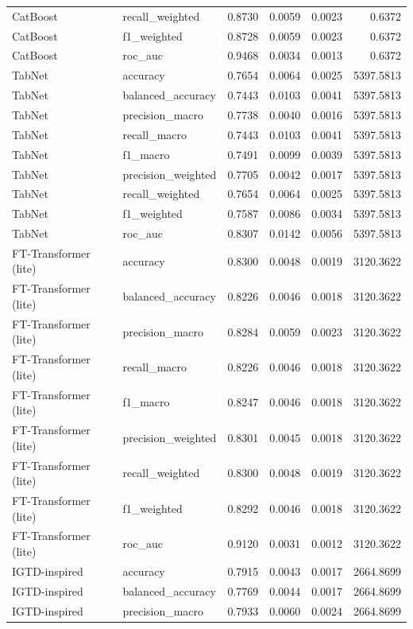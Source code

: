 \begin{tabular}{llrrrr}
CatBoost & recall_weighted & 0.8730 & 0.0059 & 0.0023 & 0.6372 \\
CatBoost & f1_weighted & 0.8728 & 0.0059 & 0.0023 & 0.6372 \\
CatBoost & roc_auc & 0.9468 & 0.0034 & 0.0013 & 0.6372 \\
TabNet & accuracy & 0.7654 & 0.0064 & 0.0025 & 5397.5813 \\
TabNet & balanced_accuracy & 0.7443 & 0.0103 & 0.0041 & 5397.5813 \\
TabNet & precision_macro & 0.7738 & 0.0040 & 0.0016 & 5397.5813 \\
TabNet & recall_macro & 0.7443 & 0.0103 & 0.0041 & 5397.5813 \\
TabNet & f1_macro & 0.7491 & 0.0099 & 0.0039 & 5397.5813 \\
TabNet & precision_weighted & 0.7705 & 0.0042 & 0.0017 & 5397.5813 \\
TabNet & recall_weighted & 0.7654 & 0.0064 & 0.0025 & 5397.5813 \\
TabNet & f1_weighted & 0.7587 & 0.0086 & 0.0034 & 5397.5813 \\
TabNet & roc_auc & 0.8307 & 0.0142 & 0.0056 & 5397.5813 \\
FT-Transformer (lite) & accuracy & 0.8300 & 0.0048 & 0.0019 & 3120.3622 \\
FT-Transformer (lite) & balanced_accuracy & 0.8226 & 0.0046 & 0.0018 & 3120.3622 \\
FT-Transformer (lite) & precision_macro & 0.8284 & 0.0059 & 0.0023 & 3120.3622 \\
FT-Transformer (lite) & recall_macro & 0.8226 & 0.0046 & 0.0018 & 3120.3622 \\
FT-Transformer (lite) & f1_macro & 0.8247 & 0.0046 & 0.0018 & 3120.3622 \\
FT-Transformer (lite) & precision_weighted & 0.8301 & 0.0045 & 0.0018 & 3120.3622 \\
FT-Transformer (lite) & recall_weighted & 0.8300 & 0.0048 & 0.0019 & 3120.3622 \\
FT-Transformer (lite) & f1_weighted & 0.8292 & 0.0046 & 0.0018 & 3120.3622 \\
FT-Transformer (lite) & roc_auc & 0.9120 & 0.0031 & 0.0012 & 3120.3622 \\
IGTD-inspired & accuracy & 0.7915 & 0.0043 & 0.0017 & 2664.8699 \\
IGTD-inspired & balanced_accuracy & 0.7769 & 0.0044 & 0.0017 & 2664.8699 \\
IGTD-inspired & precision_macro & 0.7933 & 0.0060 & 0.0024 & 2664.8699 \\

\end{tabular}
